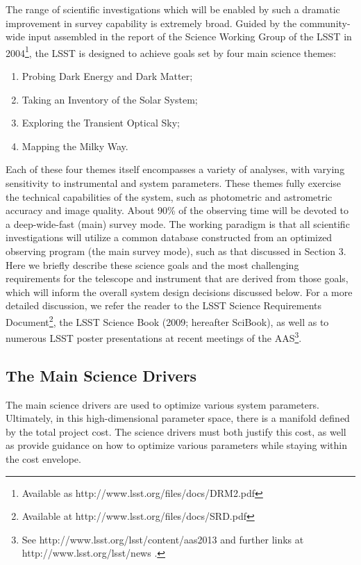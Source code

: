 \documentclass{emulateapj}
\newcommand{\B}[1]{{#1}}
\begin{document}
The range of scientific investigations which will be enabled by such a 
dramatic improvement in survey capability is extremely broad. Guided by
the community-wide input assembled in the report of the Science Working Group of the
LSST in 2004\footnote{Available as 
http://www.lsst.org/files/docs/DRM2.pdf}, the LSST is designed to 
achieve goals set by four main science themes:

\begin{enumerate}
\item Probing Dark Energy and Dark Matter;
\item Taking an Inventory of the Solar System;
\item Exploring the Transient Optical Sky;
\item Mapping the Milky Way.
\end{enumerate}

Each of these four themes itself encompasses a variety of analyses, with 
varying sensitivity to instrumental and system parameters. These themes 
fully exercise the technical capabilities of the system, such as photometric 
and astrometric accuracy and image quality. About 90\% of the observing time 
will be devoted to a deep-wide-fast (main) survey mode. The working paradigm is that all 
scientific investigations will utilize a common database constructed from an optimized 
observing program (the main survey mode), such as that discussed in Section 3. 
Here we briefly describe these science goals and the most challenging requirements for the 
telescope and instrument that are derived from those goals, which will
inform the overall system design decisions discussed below.
For a more detailed discussion, we refer the reader to the LSST Science Requirements 
Document\footnote{Available at 
http://www.lsst.org/files/docs/SRD.pdf}, 
\B{the LSST Science Book}
(2009; hereafter SciBook),
as well as to numerous LSST poster presentations at recent
meetings of the AAS\footnote{See
http://www.lsst.org/lsst/content/aas2013 and further links at
http://www.lsst.org/lsst/news .}. 


\subsection{The Main Science Drivers }

The main science drivers are used to optimize various system parameters.
Ultimately, in this high-dimensional parameter space, there is a 
manifold defined by the total project cost. The science
drivers must both justify this cost, as well as provide guidance
on how to optimize various parameters while staying within the cost envelope.
\end{document}

